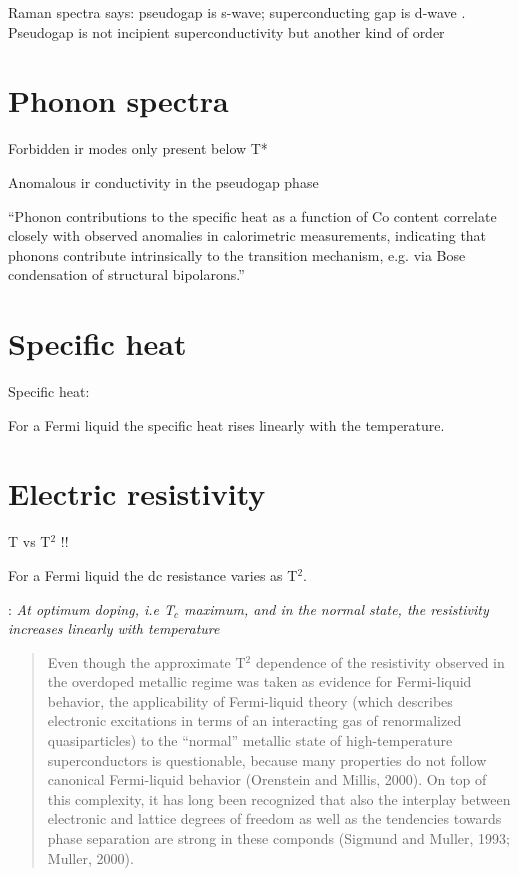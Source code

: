 Raman spectra says: pseudogap is s-wave; superconducting gap is d-wave \cite{Sakai2013}.
Pseudogap is not incipient superconductivity but another kind of order \cite{He2011}

\section{Phonon spectra}
\label{sec:phonon_spectra}

Forbidden ir modes only present below T* \cite{?}

Anomalous ir conductivity in the pseudogap phase \cite{Basov1996}

``Phonon contributions to the specific heat as a function of Co content correlate closely with observed anomalies in calorimetric measurements, indicating that phonons contribute intrinsically to the transition mechanism, e.g. via Bose condensation of structural bipolarons.'' \cite{Obhi1990} 

\section{Specific heat}
\label{sec:specific_heat}

Specific heat: \cite{Loram1993}

For a Fermi liquid the specific heat rises linearly with the temperature.

\section{Electric resistivity}
\label{sec:resistivity}

T vs T$^2$ \cite{Timusk1999}!!

For a Fermi liquid the dc resistance varies as T$^2$.

\cite{Muller2007}: \textit{At optimum doping, i.e T$_c$ maximum, and in the normal state, the resistivity increases linearly with temperature}

\cite{Damascelli2003}
\begin{quote}
Even though the approximate T$^2$ dependence of the resistivity observed in the overdoped metallic regime was taken as evidence for Fermi-liquid behavior, the applicability of Fermi-liquid theory (which describes electronic excitations in terms of an interacting gas of renormalized quasiparticles) to the ``normal'' metallic state of high-temperature superconductors is questionable, because many properties do not follow canonical Fermi-liquid behavior (Orenstein and Millis, 2000).
On top of this complexity, it has long been recognized that also the interplay between electronic and lattice degrees of freedom as well as the tendencies towards phase separation are strong in these componds (Sigmund and Muller, 1993; Muller, 2000). 
\end{quote}

